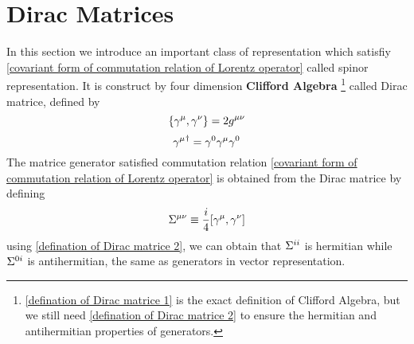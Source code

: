 
\section{Dirac Matrices}
In this section we introduce an important class of representation which satisfiy 
\eqref{covariant form of commutation relation of Lorentz operator} called spinor representation.
It is construct by four dimension \textbf{Clifford Algebra}
\footnote{\eqref{defination of Dirac matrice 1} is the exact definition of Clifford Algebra, but we still need \eqref{defination of Dirac matrice 2} to ensure the hermitian and antihermitian properties of generators. } called Dirac matrice, defined by
\begin{equation}\label{defination of Dirac matrice 1}
\acomm{\g^{\m}}{\g^{\n}} = 2g^{\m\n}
\end{equation}
\begin{equation}\label{defination of Dirac matrice 2}
{\gamma^{\mu}}^{\dagger} = \gamma^0\gamma^{\mu}\gamma^0
\end{equation}
The matrice generator satisfied commutation relation \eqref{covariant form of commutation relation of Lorentz operator} is obtained from the Dirac matrice by defining
\begin{equation}\label{definition of generators in Dirac representation}
\Si^{\m\n}\equiv \frac{i}{4}\comm{\g^{\m}}{\g^{\n}}
\end{equation}
using \eqref{defination of Dirac matrice 2}, we can obtain that $\Sigma^{ii}$ is hermitian while $\Sigma^{0i}$ is antihermitian, the same as generators in vector representation.


